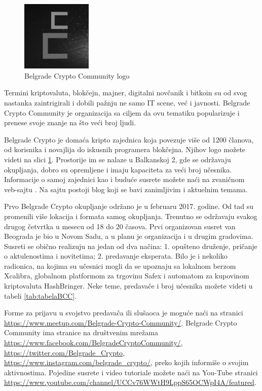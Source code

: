 \documentclass[a4paper]{article}
\begin{document}
{\begin{figure}[h]
  \centering
  \includegraphics[width=0.3\textwidth]{bcc_logo.png}
  \caption{Belgrade Crypto Community logo}
  \label{fig:bgdcclogo}
\end{figure}

Termini  kriptovaluta, blokčejn, majner, digitalni novčanik i bitkoin su od svog nastanka zaintrigirali i dobili pažnju ne samo IT scene, već i javnosti. Belgrade Crypto Community je organizacija sa ciljem da ovu tematiku popularizuje i prenese svoje znanje na što veći broj ljudi.

Belgrade Crypto je domaća kripto zajednica koja povezuje više od 1200 članova, od korisnika i novajlija do iskusnih programera blokčejna. Njihov logo možete videti na slici \ref{fig:bgdcclogo}. Prostorije im se nalaze u Balkanskoj 2, gde se održavaju okupljanja, dobro su opremljene i imaju kapaciteta za veći broj učesnika. Informacije o samoj zajednici kao i buduće susrete možete naći na zvaničnom veb-sajtu \cite{aboutBCC}. Na sajtu postoji blog koji se bavi zanimljivim i aktuelnim temama.

Prvo Belgrade Crypto okupljanje održano je u februaru 2017. godine. Od tad su promenili više lokacija i formata samog okupljanja. Trenutno se održavaju svakog drugog četvrtka u mesecu od 18 do 20 časova. Prvi organizovan susret van Beograda je bio u Novom Sadu, a u planu je organizacija i u drugim gradovima. Susreti se obično realizuju na jedan od dva načina: 1. opušteno druženje, pričanje o aktulenostima i novitetima; 2. predavanje eksperata. Bilo je i nekoliko radionica, na kojima su učesnici mogli  da se upoznaju sa lokalnom berzom Xcalibra, globalnom platformom za trgovinu Safex i automatom za kupovinom kriptovaluta HashBringer. Neke teme, predavače i broj učesnika možete videti u tabeli \ref{tab:tabelaBCC}.

Forme za prijavu u svojstvo predavača ili slušaoca je moguće naći na stranici \url{https://www.meetup.com/Belgrade-Crypto-Community/}. Belgrade Crypto Community ima stranice na društvenim mrežama \url{https://www.facebook.com/BelgradeCryptoCommunity/}, \\ \url{https://twitter.com/Belgrade_Crypto}, \\ \url{https://www.instagram.com/belgrade_crypto/}, preko kojih informiše o svojim aktivnostima. Pojedine susrete i video tutoriale možete naći na You-Tube stranici \\ \url{https://www.youtube.com/channel/UCCv76WWtH9LppS65OCWpI4A/featured}.

}
\end{document}
